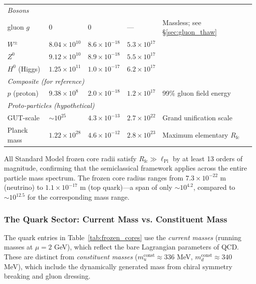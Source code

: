 \documentclass[11pt,a4paper]{article}
\newcommand{\lPl}{\ensuremath{\ell_{\mathrm{Pl}}}}
\newcommand{\Rfc}{\ensuremath{R_{\mathrm{fc}}}}
\theoremstyle{definition}
\theoremstyle{remark}
\begin{document}
\begin{table}[H]
\begin{tabular}{lllll}
\midrule
\multicolumn{5}{l}{\textit{Bosons}} \\
gluon $g$ & $0$ & $0$ & --- & Massless; see \S\ref{sec:gluon_thaw} \\
$W^{\pm}$ & $8.04 \times 10^{10}$ & $8.6 \times 10^{-18}$ & $5.3 \times 10^{17}$ & \\
$Z^0$ & $9.12 \times 10^{10}$ & $8.9 \times 10^{-18}$ & $5.5 \times 10^{17}$ & \\
$H^0$ (Higgs) & $1.25 \times 10^{11}$ & $1.0 \times 10^{-17}$ & $6.2 \times 10^{17}$ & \\
\midrule
\multicolumn{5}{l}{\textit{Composite (for reference)}} \\
$p$ (proton) & $9.38 \times 10^8$ & $2.0 \times 10^{-18}$ & $1.2 \times 10^{17}$ & 99\% gluon field energy \\
\midrule
\multicolumn{5}{l}{\textit{Proto-particles (hypothetical)}} \\
GUT-scale & $\sim 10^{25}$ & $4.3 \times 10^{-13}$ & $2.7 \times 10^{22}$ & Grand unification scale \\
Planck mass & $1.22 \times 10^{28}$ & $4.6 \times 10^{-12}$ & $2.8 \times 10^{23}$ & Maximum elementary $\Rfc$ \\
\bottomrule
\end{tabular}
\end{table}

All Standard Model frozen core radii satisfy $\Rfc \gg \lPl$ by at least 13 orders of magnitude, confirming that the semiclassical framework applies across the entire particle mass spectrum. The frozen core radius ranges from $7.3 \times 10^{-22}$ m (neutrino) to $1.1 \times 10^{-17}$ m (top quark)---a span of only $\sim 10^{4.2}$, compared to $\sim 10^{12.5}$ for the corresponding mass range.

\subsubsection{The Quark Sector: Current Mass vs. Constituent Mass}
\label{sec:quark_thaw}

The quark entries in Table~\ref{tab:frozen_cores} use the \emph{current masses} (running masses at $\mu = 2$ GeV), which reflect the bare Lagrangian parameters of QCD. These are distinct from \emph{constituent masses} ($m_u^{\mathrm{const}} \approx 336$ MeV, $m_d^{\mathrm{const}} \approx 340$ MeV), which include the dynamically generated mass from chiral symmetry breaking and gluon dressing.
\end{document}
